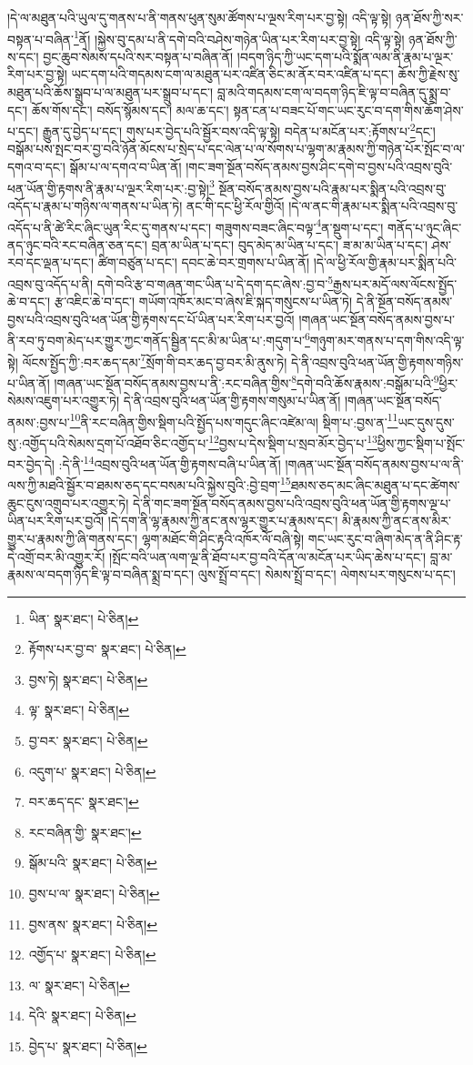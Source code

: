 །དེ་ལ་མཐུན་པའི་ཡུལ་དུ་གནས་པ་ནི་གནས་ཕུན་སུམ་ཚོགས་པ་ལྔས་རིག་པར་བྱ་སྟེ། འདི་ལྟ་སྟེ། ཉན་ཐོས་ཀྱི་སར་བསྟན་པ་བཞིན་\footnote{ཡིན་  སྣར་ཐང་།  པེ་ཅིན། }ནོ། །སྐྱེས་བུ་དམ་པ་ནི་དགེ་བའི་བཤེས་གཉེན་ཡིན་པར་རིག་པར་བྱ་སྟེ། འདི་ལྟ་སྟེ། ཉན་ཐོས་ཀྱི་ས་དང་། བྱང་ཆུབ་སེམས་དཔའི་སར་བསྟན་པ་བཞིན་ནོ། །བདག་ཉིད་ཀྱི་ཡང་དག་པའི་སྨོན་ལམ་ནི་རྣམ་པ་ལྔར་རིག་པར་བྱ་སྟེ། ཡང་དག་པའི་གདམས་ངག་ལ་མཐུན་པར་འཛིན་ཅིང་མ་ནོར་བར་འཛིན་པ་དང་། ཆོས་ཀྱི་རྗེས་སུ་མཐུན་པའི་ཆོས་སྒྲུབ་པ་ལ་མཐུན་པར་སྒྲུབ་པ་དང་། བླ་མའི་གདམས་ངག་ལ་བདག་ཉིད་ཇི་ལྟ་བ་བཞིན་དུ་སྨྲ་བ་དང་། ཆོས་གོས་དང་། བསོད་སྙོམས་དང་། མལ་ཆ་དང་། སྟན་ངན་པ་བཟང་པོ་གང་ཡང་རུང་བ་དག་གིས་ཆོག་ཤེས་པ་དང་། རྒྱུན་དུ་བྱེད་པ་དང་། གུས་པར་བྱེད་པའི་སྦྱོར་བས་འདི་ལྟ་སྟེ། བདེན་པ་མངོན་པར་:རྟོགས་པ་\footnote{རྟོགས་པར་བྱ་བ་  སྣར་ཐང་།  པེ་ཅིན། }དང་། བསྒོམ་པས་སྤང་བར་བྱ་བའི་ཉོན་མོངས་པ་སྲེད་པ་དང་ལེན་པ་ལ་སོགས་པ་ལྷག་མ་རྣམས་ཀྱི་གཉེན་པོར་སྤོང་བ་ལ་དགའ་བ་དང་། སྒོམ་པ་ལ་དགའ་བ་ཡིན་ནོ། །གང་ཟག་སྔོན་བསོད་ནམས་བྱས་ཤིང་དགེ་བ་བྱས་པའི་འབྲས་བུའི་ཕན་ཡོན་གྱི་རྟགས་ནི་རྣམ་པ་ལྔར་རིག་པར་:བྱ་སྟེ།\footnote{བྱས་ཏེ།  སྣར་ཐང་།  པེ་ཅིན། } སྔོན་བསོད་ནམས་བྱས་པའི་རྣམ་པར་སྨིན་པའི་འབྲས་བུ་འདོད་པ་རྣམ་པ་གཉིས་ལ་གནས་པ་ཡིན་ཏེ། ནང་གི་དང་ཕྱི་རོལ་གྱིའོ། །དེ་ལ་ནང་གི་རྣམ་པར་སྨིན་པའི་འབྲས་བུ་འདོད་པ་ནི་ཚེ་རིང་ཞིང་ཡུན་རིང་དུ་གནས་པ་དང་། གཟུགས་བཟང་ཞིང་བལྟ་\footnote{ལྟ་  སྣར་ཐང་།  པེ་ཅིན། }ན་སྡུག་པ་དང་། གནོད་པ་ཉུང་ཞིང་ནད་ཉུང་བའི་རང་བཞིན་ཅན་དང་། བྲན་མ་ཡིན་པ་དང་། བུད་མེད་མ་ཡིན་པ་དང་། ཟ་མ་མ་ཡིན་པ་དང་། ཤེས་རབ་དང་ལྡན་པ་དང་། ཚིག་བཙུན་པ་དང་། དབང་ཆེ་བར་གྲགས་པ་ཡིན་ནོ། །དེ་ལ་ཕྱི་རོལ་གྱི་རྣམ་པར་སྨིན་པའི་འབྲས་བུ་འདོད་པ་ནི། དགེ་བའི་རྩ་བ་གཞན་གང་ཡིན་པ་དེ་དག་དང་ཞེས་:བྱ་བ་\footnote{བྱ་བར་  སྣར་ཐང་།  པེ་ཅིན། }རྒྱས་པར་མདོ་ལས་ལོངས་སྤྱོད་ཆེ་བ་དང་། རྩ་འཇིང་ཆེ་བ་དང་། གཡོག་འཁོར་མང་བ་ཞེས་ཇི་སྐད་གསུངས་པ་ཡིན་ཏེ། དེ་ནི་སྔོན་བསོད་ནམས་བྱས་པའི་འབྲས་བུའི་ཕན་ཡོན་གྱི་རྟགས་དང་པོ་ཡིན་པར་རིག་པར་བྱའོ། །གཞན་ཡང་སྔོན་བསོད་ནམས་བྱས་པ་ནི་རབ་ཏུ་བག་མེད་པར་གྱུར་ཀྱང་གནོད་སྦྱིན་དང་མི་མ་ཡིན་པ་:གདུག་པ་\footnote{འདུག་པ་  སྣར་ཐང་།  པེ་ཅིན། }གཉུག་མར་གནས་པ་དག་གིས་འདི་ལྟ་སྟེ། ལོངས་སྤྱོད་ཀྱི་:བར་ཆད་དམ་\footnote{བར་ཆད་དང་  སྣར་ཐང་། }སྲོག་གི་བར་ཆད་བྱ་བར་མི་ནུས་ཏེ། དེ་ནི་འབྲས་བུའི་ཕན་ཡོན་གྱི་རྟགས་གཉིས་པ་ཡིན་ནོ། །གཞན་ཡང་སྔོན་བསོད་ནམས་བྱས་པ་ནི་:རང་བཞིན་གྱིས་\footnote{རང་བཞིན་གྱི་  སྣར་ཐང་། }དགེ་བའི་ཆོས་རྣམས་:བསྒོམ་པའི་\footnote{སྒོམ་པའི་  སྣར་ཐང་།  པེ་ཅིན། }ཕྱིར་སེམས་འཇུག་པར་འགྱུར་ཏེ། དེ་ནི་འབྲས་བུའི་ཕན་ཡོན་གྱི་རྟགས་གསུམ་པ་ཡིན་ནོ། །གཞན་ཡང་སྔོན་བསོད་ནམས་:བྱས་པ་\footnote{བྱས་པ་ལ་  སྣར་ཐང་།  པེ་ཅིན། }ནི་རང་བཞིན་གྱིས་སྡིག་པའི་སྤྱོད་པས་གདུང་ཞིང་འཛེམ་ལ། སྡིག་པ་:བྱས་ན་\footnote{བྱས་ནས་  སྣར་ཐང་།  པེ་ཅིན། }ཡང་དུས་དུས་སུ་:འགྱོད་པའི་སེམས་དྲག་པོ་འཐོབ་ཅིང་འགྱོད་པ་\footnote{འགྱོད་པ་  སྣར་ཐང་།  པེ་ཅིན། }བྱས་པ་དེས་སྡིག་པ་སྲབ་མོར་བྱེད་པ་\footnote{ལ་  སྣར་ཐང་།  པེ་ཅིན། }ཕྱིས་ཀྱང་སྡིག་པ་སྤོང་བར་བྱེད་དེ། :དེ་ནི་\footnote{དེའི་  སྣར་ཐང་།  པེ་ཅིན། }འབྲས་བུའི་ཕན་ཡོན་གྱི་རྟགས་བཞི་པ་ཡིན་ནོ། །གཞན་ཡང་སྔོན་བསོད་ནམས་བྱས་པ་ལ་ནི་ལས་ཀྱི་མཐའི་སྦྱོར་བ་ཐམས་ཅད་དང་བསམ་པའི་སྐྱེས་བུའི་:བྱེ་བྲག་\footnote{བྱེད་པ་  སྣར་ཐང་།  པེ་ཅིན། }ཐམས་ཅད་མང་ཞིང་མཐུན་པ་དང་ཚེགས་ཆུང་ངུས་འགྲུབ་པར་འགྱུར་ཏེ། དེ་ནི་གང་ཟག་སྔོན་བསོད་ནམས་བྱས་པའི་འབྲས་བུའི་ཕན་ཡོན་གྱི་རྟགས་ལྔ་པ་ཡིན་པར་རིག་པར་བྱའོ། །དེ་དག་ནི་ལྷ་རྣམས་ཀྱི་ནང་ནས་ལྷར་གྱུར་པ་རྣམས་དང་། མི་རྣམས་ཀྱི་ནང་ནས་མིར་གྱུར་པ་རྣམས་ཀྱི་ཞི་གནས་དང་། ལྷག་མཐོང་གི་ཤིང་རྟའི་འཁོར་ལོ་བཞི་སྟེ། གང་ཡང་རུང་བ་ཞིག་མེད་ན་ནི་ཤིང་རྟ་དེ་འགྲོ་བར་མི་འགྱུར་རོ། །སྤོང་བའི་ཡན་ལག་ལྔ་ནི་ཐོབ་པར་བྱ་བའི་དོན་ལ་མངོན་པར་ཡིད་ཆེས་པ་དང་། བླ་མ་རྣམས་ལ་བདག་ཉིད་ཇི་ལྟ་བ་བཞིན་སྨྲ་བ་དང་། ལུས་སྤྲོ་བ་དང་། སེམས་སྤྲོ་བ་དང་། ལེགས་པར་གསུངས་པ་དང་། 